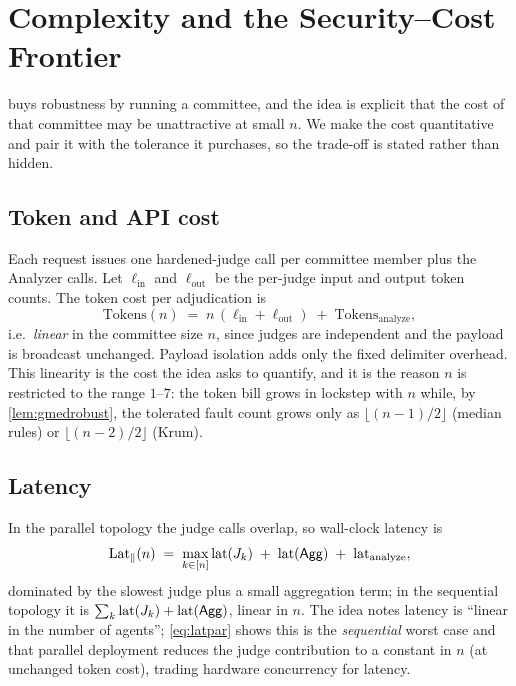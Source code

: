 \section{Complexity and the Security--Cost Frontier}
\label{sec:complexity}

\Aegis buys robustness by running a committee, and the idea is explicit that the cost of
that committee may be unattractive at small $n$. We make the cost quantitative and pair it
with the tolerance it purchases, so the trade-off is stated rather than hidden.

\subsection{Token and API cost}
Each request issues one hardened-judge call per committee member plus the Analyzer calls.
Let $\ell_{\text{in}}$ and $\ell_{\text{out}}$ be the per-judge input and output token
counts. The token cost per adjudication is
\begin{equation}
  \text{Tokens}(n) \;=\; n\,(\ell_{\text{in}}+\ell_{\text{out}}) \;+\; \text{Tokens}_{\text{analyze}},
  \label{eq:tokencost}
\end{equation}
i.e.\ \emph{linear} in the committee size $n$, since judges are independent and the payload
is broadcast unchanged. Payload isolation adds only the fixed delimiter overhead. This
linearity is the cost the idea asks to quantify, and it is the reason $n$ is restricted to
the range $1$--$7$: the token bill grows in lockstep with $n$ while, by \cref{lem:gmedrobust},
the tolerated fault count grows only as $\lfloor (n-1)/2\rfloor$ (median rules) or
$\lfloor (n-2)/2\rfloor$ (Krum).

\subsection{Latency}
In the parallel topology the judge calls overlap, so wall-clock latency is
\begin{equation}
  \text{Lat}_{\parallel}(n) \;=\; \max_{k\in[n]} \text{lat}(J_k) \;+\; \text{lat}(\mathsf{Agg}) \;+\; \text{lat}_{\text{analyze}},
  \label{eq:latpar}
\end{equation}
dominated by the slowest judge plus a small aggregation term; in the sequential topology it
is $\sum_k \text{lat}(J_k)+\text{lat}(\mathsf{Agg})$, linear in $n$. The idea notes latency is
``linear in the number of agents''; \cref{eq:latpar} shows this is the \emph{sequential}
worst case and that parallel deployment reduces the judge contribution to a constant in $n$
(at unchanged token cost), trading hardware concurrency for latency.

